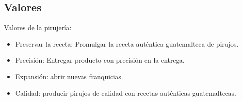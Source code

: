 \documentclass{article}
\begin{document}
\subsection{Valores}
Valores de la pirujería:
\begin{itemize}
    \item Preservar la receta: Promulgar la receta auténtica guatemalteca de pirujos.
    \item Precisión: Entregar producto con precisión en la entrega.
    \item Expansión: abrir nuevas franquicias.
    \item Calidad: producir pirujos de calidad con recetas auténticas guatemaltecas.
\end{itemize}
\end{document}
